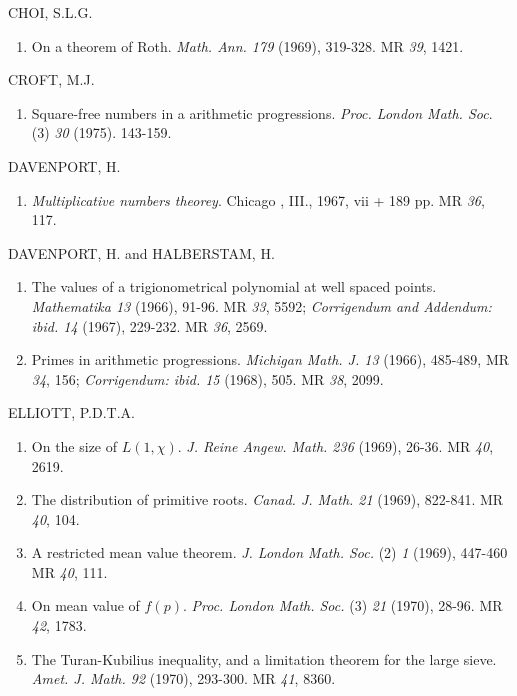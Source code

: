 \begin{thebibliography}{99}
 CHOI, S.L.G. 
 \begin{enumerate}
\item On a theorem of Roth. \textit{Math. Ann. 179} (1969),
  319-328. MR {\em 39}, 1421.
\end{enumerate}  
 
 CROFT, M.J.
\begin{enumerate}
\item Square-free numbers in a arithmetic
  progressions. \textit{Proc. London Math. Soc}. (3) {\em 30}
  (1975). 143-159.   
\end{enumerate}  
  
 DAVENPORT, H.
\begin{enumerate}
\item \textit{Multiplicative numbers theorey}. Chicago , III., 1967,
  vii + 189 pp. MR {\em 36}, 117.
\end{enumerate}

 DAVENPORT, H. and HALBERSTAM, H.
\begin{enumerate}
\item The values of a trigionometrical polynomial at well spaced
  points.  \textit{Mathematika 13} (1966), 91-96. MR {\em 33}, 5592;
  \textit{Corrigendum and Addendum: ibid. 14} (1967), 229-232. MR {\em
    36}, 2569. 

\item Primes in arithmetic progressions. \textit{Michigan Math. J.
  13} (1966), 485-489, MR {\em 34}, 156; {\em Corrigendum: ibid.
  15} (1968), 505. MR {\em 38}, 2099. 
\end{enumerate}

 ELLIOTT, P.D.T.A.\pageoriginale
\begin{enumerate}
\item On the size of $L(1, \chi)$. \textit{J. Reine Angew. Math. 236}
  (1969), 26-36. MR {\em 40}, 2619.

\item The distribution of primitive roots. {\em Canad. J. Math. 21}
  (1969), 822-841. MR {\em 40}, 104.

\item A restricted mean value theorem. \textit{J. London Math. Soc.}
  (2) {\em 1} (1969), 447-460 MR {\em 40}, 111.

\item On mean value of $f(p)$. \textit{Proc. London Math. Soc.} (3)
  {\em 21} (1970), 28-96. MR {\em 42}, 1783.

\item The Turan-Kubilius inequality, and a limitation theorem for
  the large sieve. \textit{Amet. J. Math. 92} (1970), 293-300. MR {\em
    41}, 8360.    


\end{enumerate}
\end{thebibliography}
